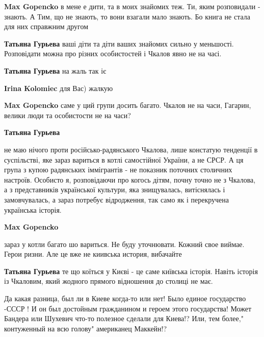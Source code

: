 \begin{itemize}
\begin{itemize}
\textbf{Max Gopencko} в мене е дити, та в моих знайомих теж. Ти, яким розповидали - знають. А Тим, що не знають, то вони взагали мало знають. Бо книга не стала для них справжним другом

\begin{itemize} %
\textbf{Татьяна Гурьева} ваші діти та діти ваших знайомих сильно у меньшості. Розповідати можна про різних особистостей і Чкалов явно не на часі.

\textbf{Татьяна Гурьева} на жаль так іє
\end{itemize} %

\textbf{Irina Kolomiec} для Вас) жалкую

\textbf{Max Gopencko} саме у ций групи досить багато. Чкалов не на часи, Гагарин, велики люди та особистости не на часи?

\begin{itemize} %
\textbf{Татьяна Гурьева} 

не маю нічого проти російсько-радянського Чкалова, лише констатую тенденції в
суспільстві, яке зараз вариться в котлі самостійної України, а не СРСР. А ця
група з купою радянських іммігрантів - не показник поточних столичних настроїв.
Особисто я, розповідаючи про когось дітям, почну точно не з Чкалова, а з
представників української культури, яка знищувалась, витіснялась і
замовчувалась, а зараз потребує відродження, так само як і перекручена
українська історія.

\end{itemize} %

\textbf{Max Gopencko} 

зараз у котли багато шо вариться. Не буду уточнювати. Кожний свое виймае. Герои
ризни. Але це вже не киивська история, вибачайте

\begin{itemize} %
\textbf{Татьяна Гурьева} те що коїться у Києві - це саме київська історія. Навіть історія із Чкаловим, який жодного прямого відношення до столиці не має.
\end{itemize} %

\end{itemize} %


Да какая разница, был ли в Киеве когда-то или нет! Было единое государство -СССР
! И он был достойным гражданином и героем этого государства! Может Бандера или
Шухевич что-то полезное сделали для Киева!? Или, тем более," контуженный на всю
голову" американец Маккейн!?


\end{itemize}
